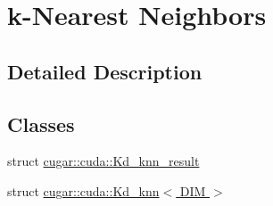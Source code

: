 \hypertarget{group__knn}{}\section{k-\/\+Nearest Neighbors}
\label{group__knn}


\subsection{Detailed Description}
\subsection*{Classes}
\begin{DoxyCompactItemize}
\item 
struct \hyperlink{structcugar_1_1cuda_1_1_kd__knn__result}{cugar\+::cuda\+::\+Kd\+\_\+knn\+\_\+result}
\item 
struct \hyperlink{structcugar_1_1cuda_1_1_kd__knn}{cugar\+::cuda\+::\+Kd\+\_\+knn$<$ D\+I\+M $>$}
\end{DoxyCompactItemize}
